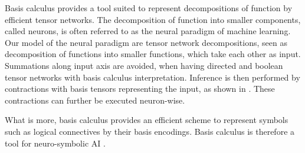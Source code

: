 
Basis calculus provides a tool suited to represent decompositions of function by efficient tensor networks.
The decomposition of function into smaller components, called neurons, is often referred to as the neural paradigm of machine learning.
Our model of the neural paradigm are tensor network decompositions, seen as decomposition of functions into smaller functions, which take each other as input.
Summations along input axis are avoided, when having directed and boolean tensor networks with basis calculus interpretation.
Inference is then performed by contractions with basis tensors representing the input, as shown in .
These contractions can further be executed neuron-wise.

What is more, basis calculus provides an efficient scheme to represent symbols such as logical connectives by their basis encodings.
Basis calculus is therefore a tool for neuro-symbolic AI \cite{garcez_neural-symbolic_2019, sarker_neuro-symbolic_2022, marra_statistical_2024}.



